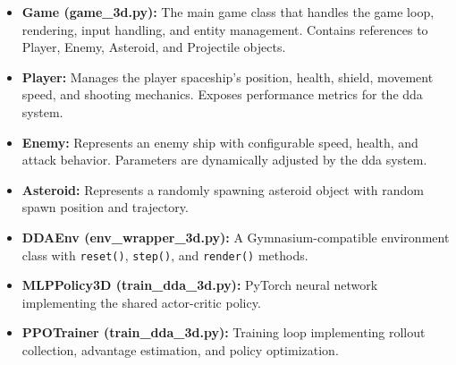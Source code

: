 \begin{itemize}
	\item \textbf{Game (game\_3d.py):} The main game class that handles the game loop, rendering, input handling, and entity management. Contains references to Player, Enemy, Asteroid, and Projectile objects.
	\item \textbf{Player:} Manages the player spaceship's position, health, shield, movement speed, and shooting mechanics. Exposes performance metrics for the \ac{dda} system.
	\item \textbf{Enemy:} Represents an enemy ship with configurable speed, health, and attack behavior. Parameters are dynamically adjusted by the \ac{dda} system.
	\item \textbf{Asteroid:} Represents a randomly spawning asteroid object with random spawn position and trajectory.
	\item \textbf{DDAEnv (env\_wrapper\_3d.py):} A Gymnasium-compatible environment class with \texttt{reset()}, \texttt{step()}, and \texttt{render()} methods.
	\item \textbf{MLPPolicy3D (train\_dda\_3d.py):} PyTorch neural network implementing the shared actor-critic policy.
	\item \textbf{PPOTrainer (train\_dda\_3d.py):} Training loop implementing rollout collection, advantage estimation, and policy optimization.
\end{itemize}

